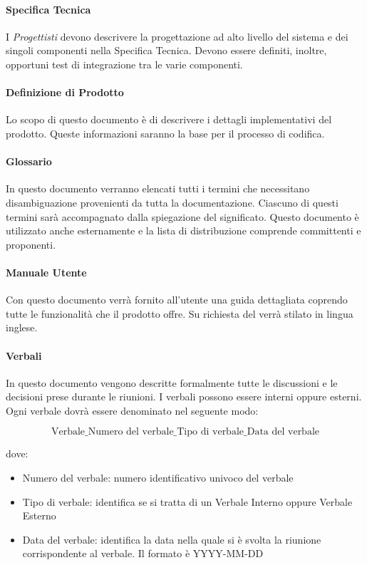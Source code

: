 \paragraph{Specifica Tecnica }
I  \emph{Progettisti}  devono descrivere la progettazione ad alto livello del
sistema e dei singoli componenti nella Specifica Tecnica. Devono
essere definiti, inoltre, opportuni test di integrazione tra le varie
componenti.



\paragraph{Definizione di Prodotto  }
Lo scopo di questo documento è di descrivere i dettagli implementativi del prodotto.
Queste informazioni saranno la base per il processo di codifica.

\paragraph{Glossario  }
In questo documento verranno elencati tutti i termini
che necessitano disambiguazione provenienti da tutta la documentazione.
Ciascuno di questi termini sarà accompagnato dalla spiegazione del
significato. Questo documento è utilizzato anche esternamente e la
lista di distribuzione comprende committenti e proponenti. 

\paragraph{Manuale Utente  }
Con questo documento verrà fornito all’utente una guida dettagliata coprendo tutte le funzionalità che il prodotto offre.
Su richiesta del  verrà stilato in lingua inglese.


\paragraph{Verbali }
In questo documento vengono descritte formalmente tutte le discussioni
e le decisioni prese durante le riunioni. I verbali possono essere
interni oppure esterni. 
Ogni verbale dovrà essere denominato nel seguente modo: 


$$\text{Verbale}\_\text{Numero del verbale}\_\text{Tipo di verbale}\_\text{Data del verbale} $$

dove:
\begin{itemize}
\item Numero del verbale: numero identificativo univoco del verbale
\item Tipo di verbale: identifica se si tratta di un Verbale Interno oppure Verbale Esterno
\item Data del verbale: identifica la data nella quale si è svolta la riunione corrispondente al verbale. Il formato è YYYY-MM-DD  
\end{itemize}


